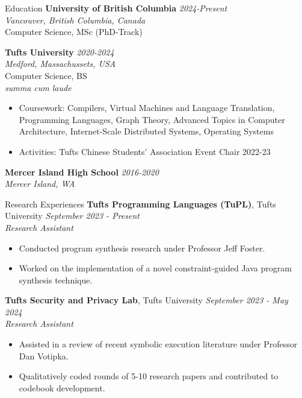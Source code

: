 \documentclass{resume} %
\begin{document}

\begin{rSection}{Education}
{\bf University of British Columbia} \hfill {\em 2024-Present}
\\ {\it Vancouver, British Columbia, Canada}
\\ Computer Science, MSc (PhD-Track)
\begin{itemize}
\end{itemize}
{\bf Tufts University} \hfill {\em 2020-2024}
\\ {\it Medford, Massachussets, USA}
\\ Computer Science, BS
\\ \textit{summa cum laude}
\begin{itemize}
    \item Coursework: Compilers, Virtual Machines and Language Translation, Programming Languages, Graph Theory, Advanced Topics in Computer Architecture, Internet-Scale Distributed Systems, Operating Systems 
    \item Activities: Tufts Chinese Students' Association Event Chair 2022-23
\end{itemize}
{\bf Mercer Island High School} \hfill {\em 2016-2020} 
\\ {\it Mercer Island, WA}

\end{rSection}
\begin{rSection}{Research Experiences}
{\bf Tufts Programming Languages (TuPL)}{, Tufts University} \hfill {\em September 2023 - Present}\\
{\it Research Assistant}
\begin{itemize}
    \item Conducted program synthesis research under Professor Jeff Foster.
    \item Worked on the implementation of a novel constraint-guided Java program synthesis technique.
\end{itemize}
{\bf Tufts Security and Privacy Lab}{, Tufts University} \hfill {\em September 2023 - May 2024}\\
{\it Research Assistant}
\begin{itemize}
    \item Assisted in a review of recent symbolic execution literature under Professor Dan Votipka.
    \item Qualitatively coded rounds of 5-10 research papers and contributed to codebook development.
\end{itemize}
\end{rSection}
\end{document}
